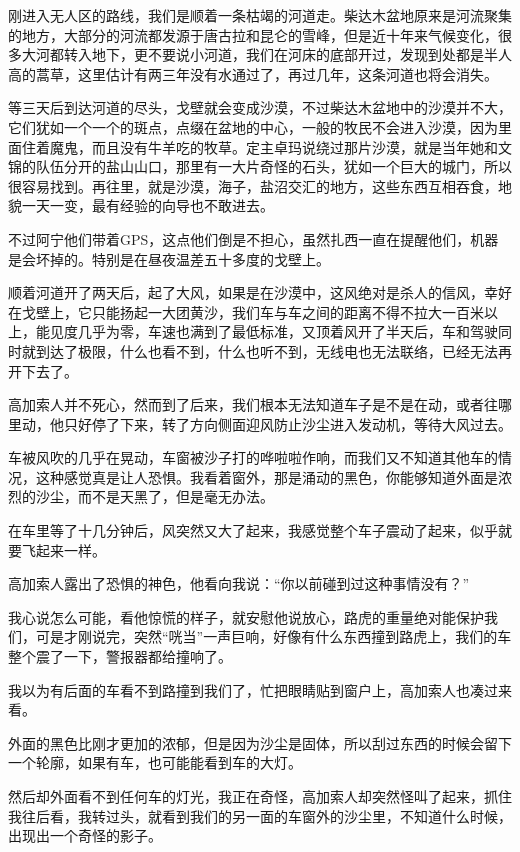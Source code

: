 刚进入无人区的路线，我们是顺着一条枯竭的河道走。柴达木盆地原来是河流聚集的地方，大部分的河流都发源于唐古拉和昆仑的雪峰，但是近十年来气候变化，很多大河都转入地下，更不要说小河道，我们在河床的底部开过，发现到处都是半人高的蒿草，这里估计有两三年没有水通过了，再过几年，这条河道也将会消失。

等三天后到达河道的尽头，戈壁就会变成沙漠，不过柴达木盆地中的沙漠并不大，它们犹如一个一个的斑点，点缀在盆地的中心，一般的牧民不会进入沙漠，因为里面住着魔鬼，而且没有牛羊吃的牧草。定主卓玛说绕过那片沙漠，就是当年她和文锦的队伍分开的盐山山口，那里有一大片奇怪的石头，犹如一个巨大的城门，所以很容易找到。再往里，就是沙漠，海子，盐沼交汇的地方，这些东西互相吞食，地貌一天一变，最有经验的向导也不敢进去。

不过阿宁他们带着GPS，这点他们倒是不担心，虽然扎西一直在提醒他们，机器是会坏掉的。特别是在昼夜温差五十多度的戈壁上。

顺着河道开了两天后，起了大风，如果是在沙漠中，这风绝对是杀人的信风，幸好在戈壁上，它只能扬起一大团黄沙，我们车与车之间的距离不得不拉大一百米以上，能见度几乎为零，车速也满到了最低标准，又顶着风开了半天后，车和驾驶同时就到达了极限，什么也看不到，什么也听不到，无线电也无法联络，已经无法再开下去了。

高加索人并不死心，然而到了后来，我们根本无法知道车子是不是在动，或者往哪里动，他只好停了下来，转了方向侧面迎风防止沙尘进入发动机，等待大风过去。

车被风吹的几乎在晃动，车窗被沙子打的哗啦啦作响，而我们又不知道其他车的情况，这种感觉真是让人恐惧。我看着窗外，那是涌动的黑色，你能够知道外面是浓烈的沙尘，而不是天黑了，但是毫无办法。

在车里等了十几分钟后，风突然又大了起来，我感觉整个车子震动了起来，似乎就要飞起来一样。

高加索人露出了恐惧的神色，他看向我说：“你以前碰到过这种事情没有？”

我心说怎么可能，看他惊慌的样子，就安慰他说放心，路虎的重量绝对能保护我们，可是才刚说完，突然“咣当”一声巨响，好像有什么东西撞到路虎上，我们的车整个震了一下，警报器都给撞响了。

我以为有后面的车看不到路撞到我们了，忙把眼睛贴到窗户上，高加索人也凑过来看。

外面的黑色比刚才更加的浓郁，但是因为沙尘是固体，所以刮过东西的时候会留下一个轮廓，如果有车，也可能能看到车的大灯。

然后却外面看不到任何车的灯光，我正在奇怪，高加索人却突然怪叫了起来，抓住我往后看，我转过头，就看到我们的另一面的车窗外的沙尘里，不知道什么时候，出现出一个奇怪的影子。

